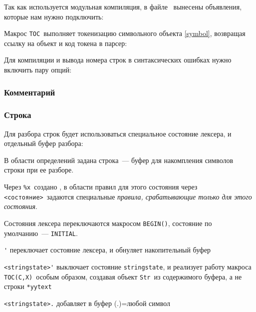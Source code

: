 \label{bilex}

Так как используется модульная компиляция, в файле \ вынесены
объявления, которые нам нужно подключить: 


Макрос \verb|TOC|\ выполняет токенизацию символьного объекта \ref{symbol},
возвращая ссылку на объект и код токена в парсер: 

\label{TOC}

\bigskip
Для компиляции и вывода номера строк в синтаксических ошибках
нужно включить пару опций:
 

\subsubsection{Комментарий}


\subsubsection{Строка}\label{lexstring}

Для разбора строк будет использоваться специальное состояние лексера,
и отдельный буфер разбора:  


В области определений задана строка\ --- буфер для накомпления символов строки
при ее разборе.

Через \verb|%x|\ создано ,
в области правил для этого состояния через \verb|<состояние>|\ задаются 
специальные \emph{правила, срабатывающие только для этого состояния}.

Состояния лексера переключаются макросом \verb|BEGIN()|, состояние по 
умолчанию\ --- \verb|INITIAL|.

\begin{description}
\item{\verb|'|} переключает состояние лексера, и обнуляет накопительный буфер
\item{\verb|<stringstate>'|} выключает состояние \verb|stringstate|,
и реализует работу макроса \verb|TOC(C,X)|\ особым образом, создавая объект
\verb|Str|\ из содержимого буфера, а не строки \verb|*yytext|
\item{\verb|<stringstate>.|} добавляет в буфер (.)=любой символ
\end{description}

